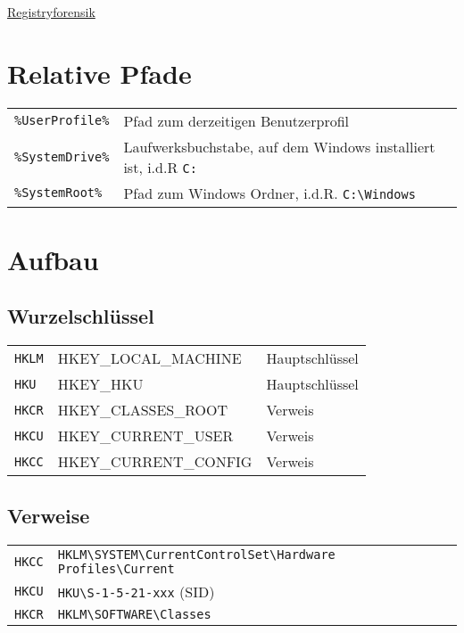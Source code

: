 \raggedright
\footnotesize
\begin{multicols}{3}	
	\setlength{\premulticols}{1pt}
	\setlength{\postmulticols}{1pt}
	\setlength{\multicolsep}{1pt}
	\setlength{\columnsep}{2pt}

\begin{center}
     \Large{\underline{Registryforensik}} \\
\end{center}

\section{Relative Pfade}
\begin{tabular}{@{}p{\the\MyLen}%
				@{}p{\linewidth-\the\MyLen}@{}}
\texttt{\%UserProfile\%} & Pfad zum derzeitigen Benutzerprofil \\
\texttt{\%SystemDrive\%} & Laufwerksbuchstabe, auf dem Windows 
							installiert ist, i.d.R \texttt{C:} \\
\texttt{\%SystemRoot\%} & Pfad zum Windows Ordner, i.d.R. \texttt{C:\textbackslash Windows}
\end{tabular}	

\section{Aufbau}
\subsection{Wurzelschlüssel}
\begin{tabular}{@{}p{\MyLen}%
				@{}p{\MyLenTwo}%
				@{}p{\linewidth-\the\MyLen-\the\MyLenTwo}@{}}
\texttt{HKLM} & HKEY\_LOCAL\_MACHINE & Hauptschlüssel \\
\texttt{HKU} & HKEY\_HKU & Hauptschlüssel \\
\texttt{HKCR} & HKEY\_CLASSES\_ROOT & Verweis\\
\texttt{HKCU} & HKEY\_CURRENT\_USER & Verweis\\
\texttt{HKCC} & HKEY\_CURRENT\_CONFIG & Verweis \\
\end{tabular}

\subsection{Verweise}
\settowidth{\MyLen}{HKCR.sp }
\begin{tabular}{@{}p{\the\MyLen}%
		@{}p{\linewidth-\the\MyLen}@{}}
\texttt{HKCC} & \texttt{HKLM\textbackslash SYSTEM\textbackslash CurrentControlSet\textbackslash Hardware Profiles\textbackslash Current} \\
\texttt{HKCU} & \texttt{HKU\textbackslash S-1-5-21-xxx} (SID)\\
\texttt{HKCR} & \texttt{HKLM\textbackslash SOFTWARE\textbackslash Classes}
\end{tabular}


\end{multicols}
